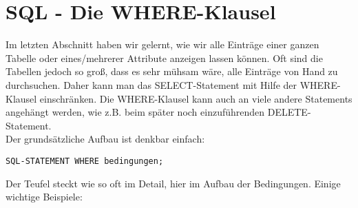 \section[WHERE-Klausel]{SQL - Die WHERE-Klausel}
Im letzten Abschnitt haben wir gelernt, wie wir alle Einträge einer ganzen Tabelle oder eines/mehrerer Attribute anzeigen lassen können. Oft sind die Tabellen jedoch so groß, dass es sehr mühsam wäre, alle Einträge von Hand zu durchsuchen. Daher kann man das SELECT-Statement mit Hilfe der WHERE-Klausel einschränken. Die WHERE-Klausel kann auch an viele andere Statements angehängt werden, wie z.B. beim später noch einzuführenden DELETE-Statement.\\
Der grundsätzliche Aufbau ist denkbar einfach:
\begin{tcolorbox}[title=WHERE-Klausel]
	\lstinline!SQL-STATEMENT WHERE bedingungen;!
\end{tcolorbox}
Der Teufel steckt wie so oft im Detail, hier im Aufbau der Bedingungen. Einige wichtige Beispiele:

